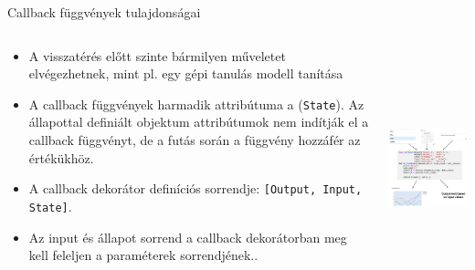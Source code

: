 \documentclass[english, aspectratio=169]{beamer}
\begin{document}
	\begin{frame}{Callback függvények tulajdonságai}
		\begin{columns}
			\begin{column}{.5\textwidth}
				\begin{itemize}
					\item A visszatérés előtt szinte bármilyen műveletet elvégezhetnek, mint pl. egy gépi tanulás modell tanítása
					\item A callback függvények harmadik attribútuma a (\texttt{State}). Az állapottal definiált objektum attribútumok nem indítják el a callback függvényt, de a futás során a függvény hozzáfér az értékükhöz.
					\item A callback dekorátor definíciós sorrendje: \texttt{[Output, Input, State]}.
					\item Az input és állapot sorrend a callback dekorátorban meg kell feleljen a paraméterek sorrendjének.. 
				\end{itemize}
			\end{column}
			\begin{column}{.5\textwidth}
				\includegraphics[height=7cm, width=7cm, keepaspectratio]{images/dash_15.png}
			\end{column}
		\end{columns}
	\end{frame}
\end{document}
